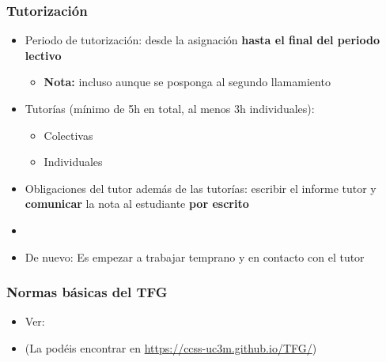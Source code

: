 \documentclass[aspectratio=43]{beamer}
\begin{document}
\begin{frame}
\frametitle{Tutorización}
\centering

\begin{itemize}
  \item Periodo de tutorización: desde la asignación \textbf{hasta el final del periodo lectivo}
  \begin{itemize}
    \item \textbf{Nota:} incluso aunque se posponga al segundo llamamiento
  \end{itemize}
  \item Tutorías (mínimo de 5h en total, al menos 3h individuales):
  \begin{itemize}
    \item Colectivas
    \item Individuales
  \end{itemize}
  \item Obligaciones del tutor además de las tutorías: escribir el informe tutor y \textbf{comunicar} la nota al estudiante \textbf{por escrito}
  \item[]
  \item De nuevo: Es \textbf{{\color{red}{importante}}} empezar a trabajar temprano y en contacto con el tutor
\end{itemize}

\end{frame}

\begin{frame}
\frametitle{Normas básicas del TFG}
\centering

\begin{itemize}
  \item Ver: 
  \item[] (La podéis encontrar en \url{https://ccss-uc3m.github.io/TFG/})
\end{itemize}

\end{frame}
\end{document}
